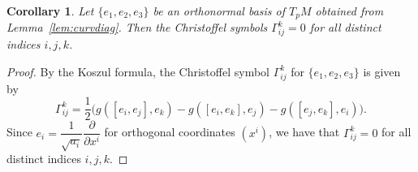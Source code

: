 \documentclass[12pt,a4paper]{amsart}
\newtheorem{Lem}[Thm]{Lemma}
\newtheorem{Cor}[Thm]{Corollary}
\theoremstyle{definition}
\theoremstyle{remark}
\newcommand \<{\langle}
\renewcommand \>{\rangle}
\begin{document}




\begin{Cor}\label{cor}
 Let  $\{e_1, e_2, e_3\}$ be an orthonormal basis of $T_p M$ obtained from Lemma~\ref{lem:curvdiag}.
 Then the  Christoffel symbols $\Gamma_{ij}^k=0$ for all distinct indices $i,j,k$.
  \end{Cor}
  \begin{proof}
    By the Koszul formula, the Christoffel symbol $\Gamma_{ij}^{k}$ for $\{e_1, e_2, e_3\}$ is given by
    \begin{equation*}
        \Gamma_{ij}^{k} = \frac{1}{2}\big(g([e_i,e_j],e_k)-g([e_i,e_k],e_j)-g([e_j,e_k],e_i)\big).
    \end{equation*}
    Since $e_i = \dfrac{1}{\sqrt{a_i}}\dfrac{\partial}{\partial x^i}$ for orthogonal coordinates $(x^i)$, we have that $\Gamma_{ij}^{k}=0$ for all distinct indices $i,j,k$.
  \end{proof}



\end{document}
